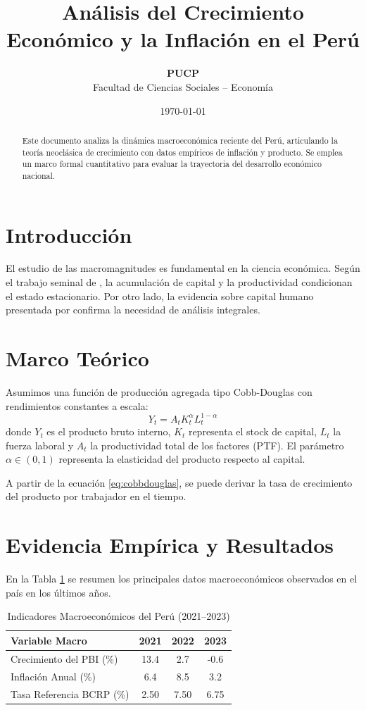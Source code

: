 \documentclass[12pt, a4paper]{article}
\title{\textbf{Análisis del Crecimiento Económico y la Inflación en el Perú}}
\author{\textbf{PUCP} \\ Facultad de Ciencias Sociales -- Economía}
\date{\today}
\begin{document}
\maketitle

\begin{abstract}
Este documento analiza la dinámica macroeconómica reciente del Perú, articulando la teoría neoclásica de crecimiento con datos empíricos de inflación y producto. Se emplea un marco formal cuantitativo para evaluar la trayectoria del desarrollo económico nacional.
\end{abstract}

\section{Introducción}
El estudio de las macromagnitudes es fundamental en la ciencia económica. Según el trabajo seminal de \cite{solow1956}, la acumulación de capital y la productividad condicionan el estado estacionario. Por otro lado, la evidencia sobre capital humano presentada por \cite{mankiw1992} confirma la necesidad de análisis integrales.

\section{Marco Teórico}
Asumimos una función de producción agregada tipo Cobb-Douglas con rendimientos constantes a escala:
\begin{equation}
    Y_t = A_t K_t^\alpha L_t^{1-\alpha}
    \label{eq:cobbdouglas}
\end{equation}
donde $Y_t$ es el producto bruto interno, $K_t$ representa el stock de capital, $L_t$ la fuerza laboral y $A_t$ la productividad total de los factores (PTF). El parámetro $\alpha \in (0,1)$ representa la elasticidad del producto respecto al capital.

A partir de la ecuación \ref{eq:cobbdouglas}, se puede derivar la tasa de crecimiento del producto por trabajador en el tiempo.

\section{Evidencia Empírica y Resultados}
En la Tabla \ref{tab:macro_datos} se resumen los principales datos macroeconómicos observados en el país en los últimos años.

\begin{table}[h!]
\centering
\caption{Indicadores Macroeconómicos del Perú (2021--2023)}
\label{tab:macro_datos}
\begin{tabular}{lccc}
\toprule
\textbf{Variable Macro} & \textbf{2021} & \textbf{2022} & \textbf{2023} \\
\midrule
Crecimiento del PBI (\%) & 13.4 & 2.7 & -0.6 \\
Inflación Anual (\%) & 6.4 & 8.5 & 3.2 \\
Tasa Referencia BCRP (\%) & 2.50 & 7.50 & 6.75 \\
\bottomrule
\end{tabular}
\end{table}
\end{document}
